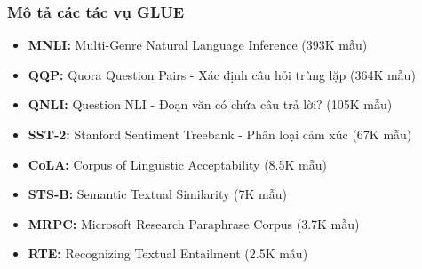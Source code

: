 \subsubsection{Mô tả các tác vụ GLUE}
\begin{itemize}
    \item \textbf{MNLI:} Multi-Genre Natural Language Inference (393K mẫu)
    \item \textbf{QQP:} Quora Question Pairs - Xác định câu hỏi trùng lặp (364K mẫu)
    \item \textbf{QNLI:} Question NLI - Đoạn văn có chứa câu trả lời? (105K mẫu)
    \item \textbf{SST-2:} Stanford Sentiment Treebank - Phân loại cảm xúc (67K mẫu)
    \item \textbf{CoLA:} Corpus of Linguistic Acceptability (8.5K mẫu)
    \item \textbf{STS-B:} Semantic Textual Similarity (7K mẫu)
    \item \textbf{MRPC:} Microsoft Research Paraphrase Corpus (3.7K mẫu)
    \item \textbf{RTE:} Recognizing Textual Entailment (2.5K mẫu)
\end{itemize}

\begin{table}[H]
    \centering
    \caption{Kết quả BERT trên GLUE test set. Điểm số cao nhất được in đậm.}
    \label{tab:glue_results_detailed}
\end{table}

